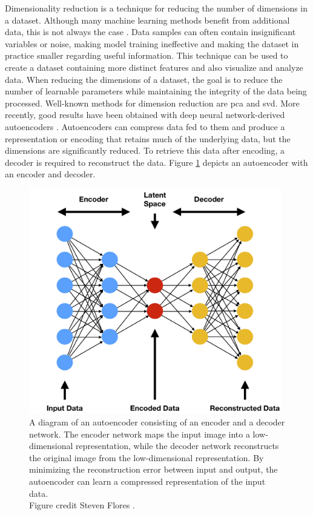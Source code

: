         Dimensionality reduction is a technique for reducing the number of dimensions in a dataset. 
        Although many machine learning methods benefit from additional data, this is not always the case \cite{belkinReconcilingModernMachinelearning2019, nakkiranDeepDoubleDescent2021}. Data samples can often contain insignificant variables or noise, making model training ineffective and making the dataset in practice smaller regarding useful information. This technique can be used to create a dataset containing more distinct features and also visualize and analyze data. When reducing the dimensions of a dataset, the goal is to reduce the number of learnable parameters while maintaining the integrity of the data being processed. Well-known methods for dimension reduction are \gls{pca} and \gls{svd}. More recently, good results have been obtained with deep neural network-derived autoencoders \cite{sakuradaAnomalyDetectionUsing2014}. Autoencoders can compress data fed to them and produce a representation or encoding that retains much of the underlying data, but the dimensions are significantly reduced.
        To retrieve this data after encoding, a decoder is required to reconstruct the data. Figure \ref{fig:auto_encoder} depicts an autoencoder with an encoder and decoder.

        \begin{figure}[htb]
            \centering
            \includegraphics[width=11cm]{images/auto_encoder.png}
            \caption{A diagram of an autoencoder consisting of an encoder and a decoder network. The encoder network maps the input image into a low-dimensional representation, while the decoder network reconstructs the original image from the low-dimensional representation. By minimizing the reconstruction error between input and output, the autoencoder can learn a compressed representation of the input data.\\Figure credit Steven Flores \cite{floresVariationalAutoencodersAre2019}.}
            \label{fig:auto_encoder}
        \end{figure} 
        
